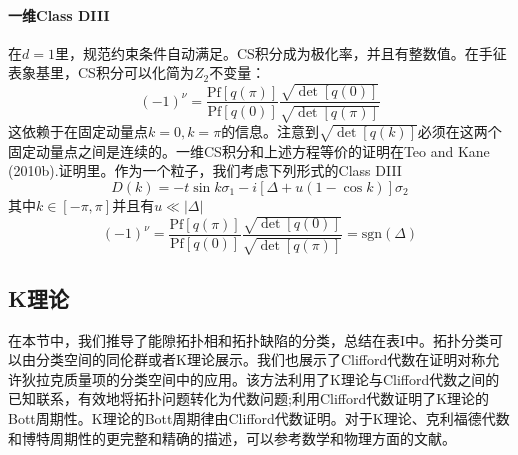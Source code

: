 \documentclass[a4paper]{article}
\numberwithin{equation}{subsection}
\begin{document}
\paragraph{一维Class DIII}
在$d=1$里，规范约束条件自动满足。CS积分成为极化率，并且有整数值。在手征表象基里，CS积分可以化简为$Z_2$不变量：
\begin{equation}
    (-1)^\nu=\frac{\mathrm{Pf}[q(\pi)]}{\mathrm{Pf}[q(0)]}\frac{\sqrt{\det[q(0)]}}{\sqrt{\det[q(\pi)]}}
\end{equation}
这依赖于在固定动量点$k=0,k=\pi$的信息。注意到$\sqrt{\det[q(k)]}$必须在这两个固定动量点之间是连续的。一维CS积分和上述方程等价的证明在Teo and Kane (2010b).证明里。作为一个粒子，我们考虑下列形式的Class DIII
\begin{equation}
    D(k)=-t\sin k\sigma_1-i[\Delta+u(1-\cos k)]\sigma_2
\end{equation}
其中$k\in[-\pi,\pi]$并且有$u\ll |\Delta|$
\begin{equation}
    (-1)^\nu=\frac{\mathrm{Pf}[q(\pi)]}{\mathrm{Pf}[q(0)]}\frac{\sqrt{\det[q(0)]}}{\sqrt{\det[q(\pi)]}}=\mathrm{sgn}(\Delta)
\end{equation}
\subsection{K理论}
在本节中，我们推导了能隙拓扑相和拓扑缺陷的分类，总结在表I中。拓扑分类可以由分类空间的同伦群或者K理论展示。我们也展示了Clifford代数在证明对称允许狄拉克质量项的分类空间中的应用。该方法利用了K理论与Clifford代数之间的已知联系，有效地将拓扑问题转化为代数问题;利用Clifford代数证明了K理论的Bott周期性。K理论的Bott周期律由Clifford代数证明。对于K理论、克利福德代数和博特周期性的更完整和精确的描述，可以参考数学和物理方面的文献。
\end{document}
